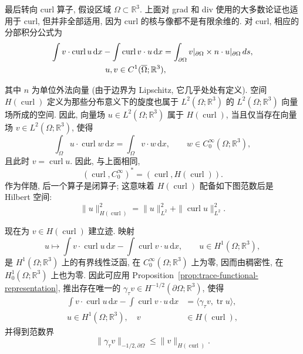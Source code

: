 最后转向 curl 算子, 假设区域 $\Omega\subset\mathbb R^3$. 上面对 grad 和 div 使用的大多数论证也适用于 curl, 但并非全部适用, 因为 curl 的核与像都不是有限余维的. 对 curl, 相应的分部积分公式为
\begin{equation}\label{eq:curl-classical-green}
\begin{aligned}
\int v\cdot\operatorname{curl}u\,\mathrm{d}x-\int\operatorname{curl}v\cdot u\,\mathrm{d}x&=\int_{\partial\Omega}v|_{\partial\Omega}\times n\cdot u|_{\partial\Omega}\,ds,\\
&\hspace{-7em}u,v\in C^1(\overline\Omega;\mathbb R^3),
\end{aligned}
\end{equation}

其中 $n$ 为单位外法向量 (由于边界为 Lipschitz, 它几乎处处有定义). 空间 $H(\operatorname{curl})$ 定义为那些分布意义下的旋度也属于 $L^2(\Omega;\mathbb R^3)$ 的 $L^2(\Omega;\mathbb R^3)$ 向量场所成的空间. 因此, 向量场 $u\in L^2(\Omega;\mathbb R^3)$ 属于 $H(\operatorname{curl})$, 当且仅当存在向量场 $v\in L^2(\Omega;\mathbb R^3)$, 使得
\begin{equation}\label{eq:distributional-curl}
\int_\Omega u\cdot\operatorname{curl}w\,\mathrm{d}x=\int_\Omega v\cdot w\,\mathrm{d}x,\qquad w\in C_0^\infty(\Omega;\mathbb R^3),
\end{equation}
且此时 $v=\operatorname{curl}u$. 因此, 与上面相同,
\[
(\operatorname{curl},C_0^\infty)^*=(\operatorname{curl},H(\operatorname{curl})).
\]
作为伴随, 后一个算子是闭算子; 这意味着 $H(\operatorname{curl})$ 配备如下图范数后是 Hilbert 空间:
\[
\|u\|_{H(\operatorname{curl})}^2=\|u\|_{L^2}^2+\|\operatorname{curl}u\|_{L^2}^2.
\]

现在为 $v\in H(\operatorname{curl})$ 建立迹. 映射
\[
u\mapsto\int v\cdot\operatorname{curl}u\,\mathrm{d}x-\int\operatorname{curl}v\cdot u\,\mathrm{d}x,\qquad u\in H^1(\Omega;\mathbb R^3),
\]
是 $H^1(\Omega;\mathbb R^3)$ 上的有界线性泛函, 在 $C_0^\infty(\Omega;\mathbb R^3)$ 上为零, 因而由稠密性, 在 $ H_0^1(\Omega;\mathbb R^3)$ 上也为零. 因此可应用 Proposition~\ref{prop:trace-functional-representation}, 推出存在唯一的 $\gamma_\tau v\in H^{-1/2}(\partial\Omega;\mathbb R^3)$, 使得
\begin{equation}\label{eq:tangential-trace-green}
\begin{aligned}
\int v\cdot\operatorname{curl}u\,\mathrm{d}x-\int\operatorname{curl}v\cdot u\,\mathrm{d}x&=\langle\gamma_\tau v,\operatorname{tr}u\rangle,\\
u\in H^1(\Omega;\mathbb R^3),\quad v&\in H(\operatorname{curl}),
\end{aligned}
\end{equation}
并得到范数界
\begin{equation}\label{eq:tangential-trace-bound}
\|\gamma_\tau v\|_{-1/2,\partial\Omega}\leq\|v\|_{H(\operatorname{curl})}.
\end{equation}

